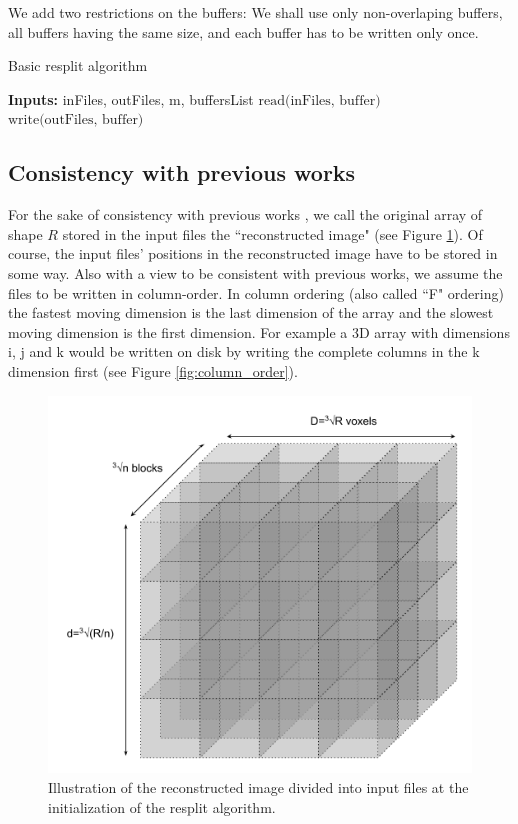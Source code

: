 \documentclass[conference]{IEEEtran}
\begin{document}
We add two restrictions on the buffers: We shall use only non-overlaping buffers, all buffers having the same size, and each buffer has to be written only once.

\begin{algorithm}[H]
  \caption{Basic resplit algorithm}
  \label{algo:generalresplit}
  \begin{algorithmic}
    \STATE \textbf{Inputs:} {inFiles, outFiles, m, buffersList}
      \STATE $\textrm{read(inFiles, buffer)}$
      \STATE $\textrm{write(outFiles, buffer)}$
    \ENDFOR

  \end{algorithmic}
\end{algorithm}

\subsection{Consistency with previous works}
For the sake of consistency with previous works \cite{seqalgorithms}, we call the original array of shape $R$ stored in the input files the ``reconstructed image" (see Figure \ref{fig:reconstructed_img_divided}).
Of course, the input files' positions in the reconstructed image have to be stored in some way.
Also with a view to be consistent with previous works, we assume the files to be written in column-order.
In column ordering (also called ``F" ordering) the fastest moving dimension is the last dimension of the array and the slowest moving dimension is the first dimension.
For example a 3D array with dimensions i, j and k would be written on disk by writing the complete columns in the k dimension first (see Figure \ref{fig:column_order}).

\begin{figure}[h!]
\centering
\includegraphics[scale=0.2]{./figures/reconstructed_img_divided.png}
\caption{Illustration of the reconstructed image divided into input files at the initialization of the resplit algorithm.
}
\label{fig:reconstructed_img_divided}
\end{figure}
\end{document}
